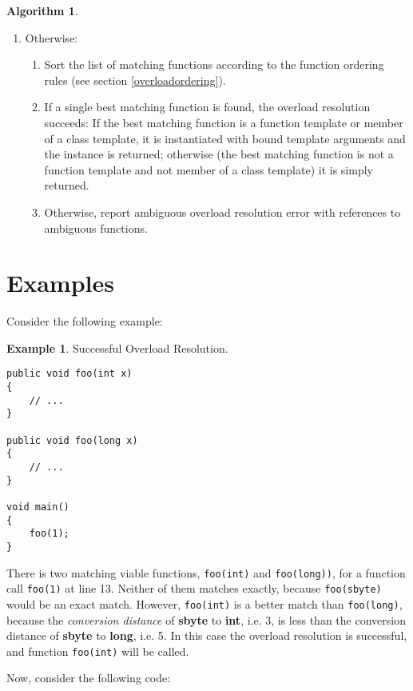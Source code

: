 \documentclass[a4paper,oneside,11pt]{book}
\theoremstyle{definition}
\newtheorem{exmp}{Example}[section]
\newtheorem{algo}{Algorithm}[section]
\begin{document}
\begin{algo}
\begin{enumerate}
\begin{enumerate}
\item
Otherwise:
\begin{enumerate}
\item
Sort the list of matching functions according to the function ordering rules (see section \ref{overloadordering}).
\item
If a single best matching function is found, the overload resolution succeeds:
If the best matching function is a function template or member of a class template, it is instantiated with bound template arguments
and the instance is returned; otherwise (the best matching function is not a function template and not member of a class template) it is simply returned.
\item
Otherwise, report ambiguous overload resolution error with references to ambiguous functions.
\end{enumerate}
\end{enumerate}
\end{enumerate}
\end{algo}

\section{Examples}

Consider the following example:

\begin{exmp} Successful Overload Resolution.
\lstset{language=Cmajor}
\begin{lstlisting}[frame=trBL]
public void foo(int x)
{
    // ...
}

public void foo(long x)
{
    // ...
}

void main()
{
    foo(1);
}
\end{lstlisting}

There is two matching viable functions, \verb|foo(int)| and \verb|foo(long))|, for a function call \verb|foo(1)| at line 13.
Neither of them matches exactly, because \verb|foo(sbyte)| would be an exact match.
However, \verb|foo(int)| is a better match than \verb|foo(long)|, because the \emph{conversion distance} of \textbf{sbyte} to \textbf{int}, i.e. 3, is less than
the conversion distance of \textbf{sbyte} to \textbf{long}, i.e. 5.
In this case the overload resolution is successful, and function \verb|foo(int)| will be called.
\end{exmp}
\clearpage
Now, consider the following code:
\end{document}
